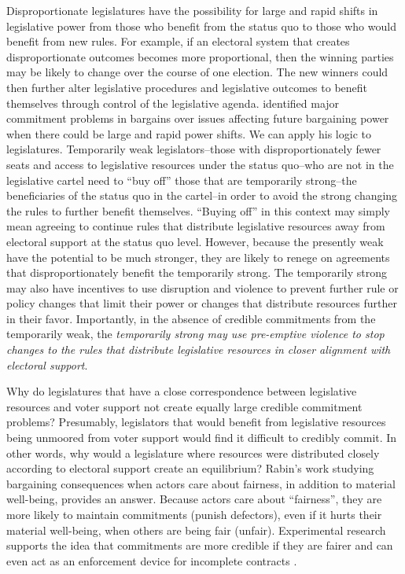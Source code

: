 \documentclass[a4paper]{article}\usepackage[]{graphicx}\usepackage[]{color}
\begin{document}
Disproportionate legislatures have the possibility for large and rapid shifts in legislative power from those who benefit from the status quo to those who would benefit from new rules. For example, if an electoral system that creates disproportionate outcomes becomes more proportional, then the winning parties may be likely to change over the course of one election. The new winners could then further alter legislative procedures and legislative outcomes to benefit themselves through control of the legislative agenda. \cite{Powell2004,Powell2006} identified major commitment problems in bargains over issues affecting future bargaining power when there could be large and rapid power shifts. We can apply his logic to legislatures. Temporarily weak legislators--those with disproportionately fewer seats and access to legislative resources under the status quo--who are not in the legislative cartel need to ``buy off'' those that are temporarily strong--the beneficiaries of the status quo in the cartel--in order to avoid the strong changing the rules to further benefit themselves. ``Buying off'' in this context may simply mean agreeing to continue rules that distribute legislative resources away from electoral support at the status quo level. However, because the presently weak have the potential to be much stronger, they are likely to renege on agreements that disproportionately benefit the temporarily strong. The temporarily strong may also have incentives to use disruption and violence to prevent further rule or policy changes that limit their power or changes that distribute resources further in their favor. Importantly, in the absence of credible commitments from the temporarily weak, the \emph{temporarily strong may use pre-emptive violence to stop changes to the rules that distribute legislative resources in closer alignment with electoral support}.

Why do legislatures that have a close correspondence between legislative resources and voter support not create equally large credible commitment problems? Presumably, legislators that would benefit from legislative resources being unmoored from voter support would find it difficult to credibly commit. In other words, why would a legislature where resources were distributed closely according to electoral support create an equilibrium? Rabin's \citeyearpar{Rabin1993} work studying bargaining consequences when actors care about fairness, in addition to material well-being, provides an answer. Because actors care about ``fairness'', they are more likely to maintain commitments (punish defectors), even if it hurts their material well-being, when others are being fair (unfair). Experimental research supports the idea that commitments are more credible if they are fairer \citep{Ellingsen2004} and can even act as an enforcement device for incomplete contracts \citep{Fehr2008}.
\end{document}
